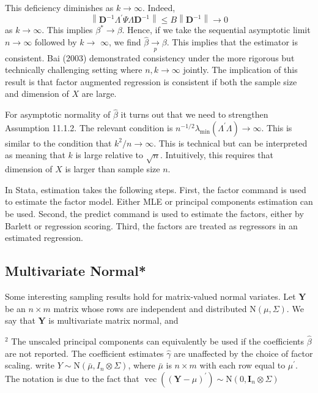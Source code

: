 \documentclass[10pt]{article}
\begin{document}
This deficiency diminishes as $k \rightarrow \infty$. Indeed,
$$
\left\|\boldsymbol{D}^{-1} \Lambda^{\prime} \Psi \Lambda \boldsymbol{D}^{-1}\right\| \leq B\left\|\boldsymbol{D}^{-1}\right\| \rightarrow 0
$$
as $k \rightarrow \infty$. This implies $\beta^{*} \rightarrow \beta$. Hence, if we take the sequential asymptotic limit $n \rightarrow \infty$ followed by $k \rightarrow$ $\infty$, we find $\widehat{\beta} \underset{p}{\longrightarrow} \beta$. This implies that the estimator is consistent. Bai (2003) demonstrated consistency under the more rigorous but technically challenging setting where $n, k \rightarrow \infty$ jointly. The implication of this result is that factor augmented regression is consistent if both the sample size and dimension of $X$ are large.

For asymptotic normality of $\widehat{\beta}$ it turns out that we need to strengthen Assumption 11.1.2. The relevant condition is $n^{-1 / 2} \lambda_{\min }\left(\Lambda^{\prime} \Lambda\right) \rightarrow \infty$. This is similar to the condition that $k^{2} / n \rightarrow \infty$. This is technical but can be interpreted as meaning that $k$ is large relative to $\sqrt{n}$. Intuitively, this requires that dimension of $X$ is larger than sample size $n$.

In Stata, estimation takes the following steps. First, the factor command is used to estimate the factor model. Either MLE or principal components estimation can be used. Second, the predict command is used to estimate the factors, either by Barlett or regression scoring. Third, the factors are treated as regressors in an estimated regression.

\subsection{Multivariate Normal*}
Some interesting sampling results hold for matrix-valued normal variates. Let $\boldsymbol{Y}$ be an $n \times m$ matrix whose rows are independent and distributed $\mathrm{N}(\mu, \Sigma)$. We say that $\boldsymbol{Y}$ is multivariate matrix normal, and

${ }^{2}$ The unscaled principal components can equivalently be used if the coefficients $\widehat{\beta}$ are not reported. The coefficient estimates $\hat{\gamma}$ are unaffected by the choice of factor scaling. write $Y \sim \mathrm{N}\left(\bar{\mu}, I_{n} \otimes \Sigma\right)$, where $\bar{\mu}$ is $n \times m$ with each row equal to $\mu^{\prime}$. The notation is due to the fact that $\operatorname{vec}\left((\boldsymbol{Y}-\mu)^{\prime}\right) \sim \mathrm{N}\left(0, \boldsymbol{I}_{n} \otimes \Sigma\right)$
\end{document}
